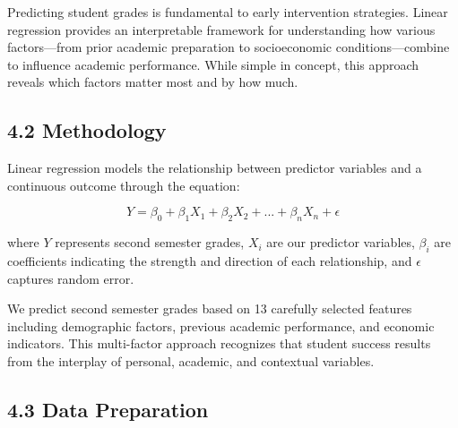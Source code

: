 \documentclass[
]{article}
\begin{document}
Predicting student grades is fundamental to early intervention
strategies. Linear regression provides an interpretable framework for
understanding how various factors---from prior academic preparation to
socioeconomic conditions---combine to influence academic performance.
While simple in concept, this approach reveals which factors matter most
and by how much.

\subsection{4.2 Methodology}\label{methodology}

Linear regression models the relationship between predictor variables
and a continuous outcome through the equation:

\[Y = \beta_0 + \beta_1X_1 + \beta_2X_2 + ... + \beta_nX_n + \epsilon\]

where \(Y\) represents second semester grades, \(X_i\) are our predictor
variables, \(\beta_i\) are coefficients indicating the strength and
direction of each relationship, and \(\epsilon\) captures random error.

We predict second semester grades based on 13 carefully selected
features including demographic factors, previous academic performance,
and economic indicators. This multi-factor approach recognizes that
student success results from the interplay of personal, academic, and
contextual variables.

\subsection{4.3 Data Preparation}\label{data-preparation}
\end{document}
